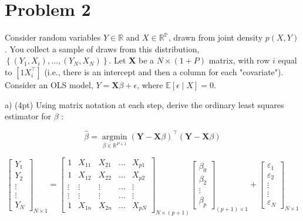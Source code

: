 \documentclass{article}\usepackage[]{graphicx}\usepackage[]{color}
\begin{document}
\section*{Problem 2}

Consider random variables $Y \in \mathbb{R}$ and $X \in \mathbb{R}^{\mathbb{P}}$, drawn from joint density $p(X, Y)$. You collect a sample of draws from this distribution, $\left\{\left(Y_{1}, X_{i}\right), \ldots,\left(Y_{N}, X_{N}\right)\right\}$.   
Let $\mathbf{X}$ be a $N \times(1+P)$ matrix, with row $i$ equal to $\left[1 X_{i}^{\top}\right]$ (i.e., there is an intercept and then a column for each "covariate"). Consider an OLS model, $Y=\mathbf{X} \beta+\epsilon$, where $\mathbb{E}[\epsilon \mid X]=0$. 


a) (4pt) Using matrix notation at each step, derive the ordinary least squares estimator for $\beta$ :

$$
\hat{\beta}=\underset{\beta \in \mathbb{R}^{P+1}}{\operatorname{argmin}}(\mathbf{Y}-\mathbf{X} \beta)^{\top}(\mathbf{Y}-\mathbf{X} \beta)
$$


\vspace*{0.5cm}
$$
\left[\begin{array}{c}
Y_{1} \\
Y_{2} \\
\vdots \\
\vdots \\
Y_{N}
\end{array}\right]_{N \times 1}=\left[\begin{array}{ccccc}
1 & X_{11} & X_{21} & \ldots & X_{p 1} \\
1 & X_{12} & X_{22} & \ldots & X_{p 2} \\
\vdots & \vdots & \vdots & \ldots & \vdots \\
\vdots & \vdots & \vdots & \ldots & \vdots \\
1 & X_{1 n} & X_{2 n} & \ldots & X_{p N}
\end{array}\right]_{N \times (p+1)}\left[\begin{array}{c}
\beta_{0} \\
\beta_{2} \\
\vdots \\
\beta_{p}
\end{array}\right]_{(p+1) \times 1}+\left[\begin{array}{c}
\varepsilon_{1} \\
\varepsilon_{2} \\
\vdots \\
\vdots \\
\varepsilon_{N}
\end{array}\right]_{N \times 1}
$$
\end{document}
